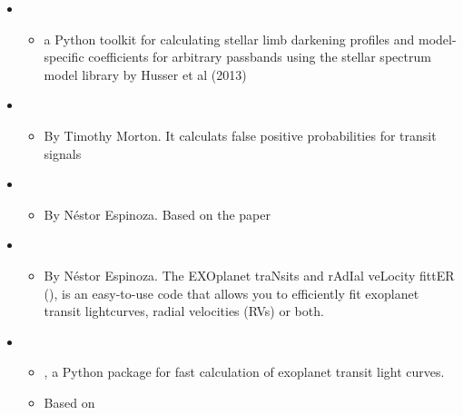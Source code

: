 \documentclass[letterpaper,10pt,english]{sphinxmanual}
\begin{document}
\begin{itemize}
\begin{itemize}
\end{itemize}

\item {} 
\begin{itemize}
\item {} 
a Python toolkit for calculating stellar limb darkening profiles
and model-specific coefficients for arbitrary passbands using the
stellar spectrum model library by Husser et al (2013)

\end{itemize}

\item {} 
\begin{itemize}
\item {} 
By Timothy Morton. It calculats false positive probabilities for
transit signals

\end{itemize}

\item {} 
\begin{itemize}
\item {} 
By Néstor Espinoza. Based on the paper 

\end{itemize}

\item {} 
\begin{itemize}
\item {} 
By Néstor Espinoza. The EXOplanet traNsits and rAdIal veLocity
fittER (), is an easy-to-use code that allows you to
efficiently fit exoplanet transit lightcurves, radial velocities
(RVs) or both.

\end{itemize}

\item {} 
\begin{itemize}
\item {} 
, a Python package for fast calculation of exoplanet
transit light curves.

\item {} 
Based on 

\end{itemize}

\end{itemize}
\end{document}
